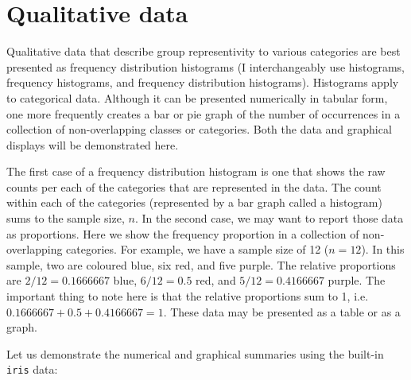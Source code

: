\documentclass[english,10pt,a4paper,oneside]{book}
\newenvironment{Shaded}{\begin{snugshade}}{\end{snugshade}}
\newcommand{\CommentTok}[1]{\textcolor[rgb]{0.56,0.35,0.01}{\textit{#1}}}
\newcommand{\DataTypeTok}[1]{\textcolor[rgb]{0.13,0.29,0.53}{#1}}
\newcommand{\KeywordTok}[1]{\textcolor[rgb]{0.13,0.29,0.53}{\textbf{#1}}}
\newcommand{\NormalTok}[1]{#1}
\newcommand{\OperatorTok}[1]{\textcolor[rgb]{0.81,0.36,0.00}{\textbf{#1}}}
\newcommand{\StringTok}[1]{\textcolor[rgb]{0.31,0.60,0.02}{#1}}
\theoremstyle{definition}
\theoremstyle{definition}
\theoremstyle{definition}
\theoremstyle{remark}
\begin{document}
\hypertarget{qualitative-data-1}{%
\section{Qualitative data}\label{qualitative-data-1}}

Qualitative data that describe group representivity to various
categories are best presented as frequency distribution histograms (I
interchangeably use histograms, frequency histograms, and frequency
distribution histograms). Histograms apply to categorical data. Although
it can be presented numerically in tabular form, one more frequently
creates a bar or pie graph of the number of occurrences in a collection
of non-overlapping classes or categories. Both the data and graphical
displays will be demonstrated here.

The first case of a frequency distribution histogram is one that shows
the raw counts per each of the categories that are represented in the
data. The count within each of the categories (represented by a bar
graph called a histogram) sums to the sample size, \(n\). In the second
case, we may want to report those data as proportions. Here we show the
frequency proportion in a collection of non-overlapping categories. For
example, we have a sample size of 12 (\(n=12\)). In this sample, two are
coloured blue, six red, and five purple. The relative proportions are
\(2/12=0.1666667\) blue, \(6/12=0.5\) red, and \(5/12=0.4166667\)
purple. The important thing to note here is that the relative
proportions sum to 1, i.e. \(0.1666667+0.5+0.4166667=1\). These data may
be presented as a table or as a graph.

Let us demonstrate the numerical and graphical summaries using the
built-in \texttt{iris} data:

\begin{Shaded}
\end{Shaded}
\end{document}
